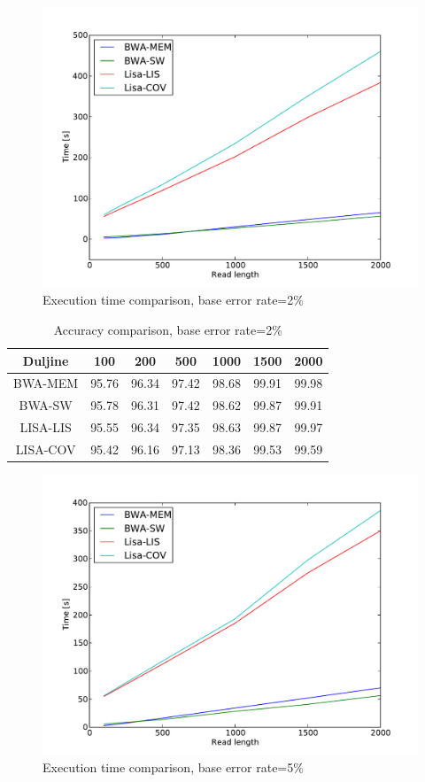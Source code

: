 \documentclass[times, utf8, diplomski]{fer}
\begin{document}
\begin{figure}[H]
\centering
\includegraphics[width=1.0\textwidth]{../img/chicken-e02-time.pdf}
\caption{Execution time comparison, base error rate=2\%}\label{chicken-e02-time}
\end{figure}

\begin{table}[H]
\centering
\begin{tabular}{|c||c|c|c|c|c|c|}
\hline
	Duljine & 100 & 200 & 500 & 1000 & 1500 & 2000\\
\hline
\hline
	BWA-MEM & 95.76 & 96.34 & 97.42 & 98.68 & 99.91 & 99.98\\
\hline
	BWA-SW  & 95.78 & 96.31 & 97.42 & 98.62 & 99.87 & 99.91\\
\hline
	LISA-LIS   & 95.55 & 96.34 & 97.35 & 98.63 & 99.87 & 99.97\\
\hline
	LISA-COV    & 95.42 & 96.16 & 97.13 & 98.36 & 99.53 & 99.59\\
\hline
\end{tabular}
\caption{Accuracy comparison, base error rate=2\%}\label{chicken-e02-correct}
\end{table}

\begin{figure}[H]
\centering
\includegraphics[width=1.0\textwidth]{../img/chicken-e05-time.pdf}
\caption{Execution time comparison, base error rate=5\%}\label{chicken-e05-time}
\end{figure}
\end{document}
